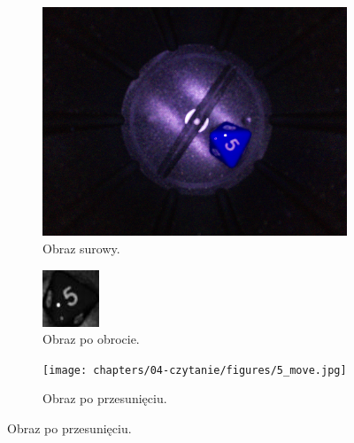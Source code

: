 \begin{figure}[H]
    \centering
    \begin{subfigure}[t]{0.32\linewidth}
        \centering
        \includegraphics[width=\linewidth]{chapters/04-czytanie/figures/5_raw.jpg}
        \caption{Obraz surowy.}
        \label{fig:5raw}
    \end{subfigure}
    \hfill
    \begin{subfigure}[t]{0.32\linewidth}
        \centering
        \includegraphics[width=\linewidth]{chapters/04-czytanie/figures/5_rotate.jpg}
        \caption{Obraz po obrocie.}
        \label{fig:5rotate}
    \end{subfigure}
    \hfill
    \begin{subfigure}[t]{0.32\linewidth}
        \centering
        \texttt{[image: chapters/04-czytanie/figures/5\_move.jpg]}
        \caption{Obraz po przesunięciu.}
        \label{fig:5move}
    \end{subfigure}


\end{figure}
